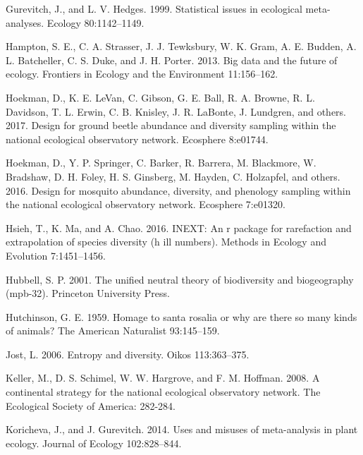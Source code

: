 \documentclass[
  12pt,
]{article}
\newlength{\cslhangindent}
\newenvironment{cslreferences}%
  {\setlength{\parindent}{0pt}%
  \everypar{\setlength{\hangindent}{\cslhangindent}}\ignorespaces}%
  {\par}
\begin{document}
\begin{cslreferences}
\leavevmode\hypertarget{ref-gurevitch1999statistical}{}%
Gurevitch, J., and L. V. Hedges. 1999. Statistical issues in ecological meta-analyses. Ecology 80:1142--1149.

\leavevmode\hypertarget{ref-hampton2013big}{}%
Hampton, S. E., C. A. Strasser, J. J. Tewksbury, W. K. Gram, A. E. Budden, A. L. Batcheller, C. S. Duke, and J. H. Porter. 2013. Big data and the future of ecology. Frontiers in Ecology and the Environment 11:156--162.

\leavevmode\hypertarget{ref-hoekman2017design}{}%
Hoekman, D., K. E. LeVan, C. Gibson, G. E. Ball, R. A. Browne, R. L. Davidson, T. L. Erwin, C. B. Knisley, J. R. LaBonte, J. Lundgren, and others. 2017. Design for ground beetle abundance and diversity sampling within the national ecological observatory network. Ecosphere 8:e01744.

\leavevmode\hypertarget{ref-hoekman2016design}{}%
Hoekman, D., Y. P. Springer, C. Barker, R. Barrera, M. Blackmore, W. Bradshaw, D. H. Foley, H. S. Ginsberg, M. Hayden, C. Holzapfel, and others. 2016. Design for mosquito abundance, diversity, and phenology sampling within the national ecological observatory network. Ecosphere 7:e01320.

\leavevmode\hypertarget{ref-hsieh2016inext}{}%
Hsieh, T., K. Ma, and A. Chao. 2016. INEXT: An r package for rarefaction and extrapolation of species diversity (h ill numbers). Methods in Ecology and Evolution 7:1451--1456.

\leavevmode\hypertarget{ref-hubbell2001unified}{}%
Hubbell, S. P. 2001. The unified neutral theory of biodiversity and biogeography (mpb-32). Princeton University Press.

\leavevmode\hypertarget{ref-hutchinson1959homage}{}%
Hutchinson, G. E. 1959. Homage to santa rosalia or why are there so many kinds of animals? The American Naturalist 93:145--159.

\leavevmode\hypertarget{ref-jost2006entropy}{}%
Jost, L. 2006. Entropy and diversity. Oikos 113:363--375.

\leavevmode\hypertarget{ref-keller2008continental}{}%
Keller, M., D. S. Schimel, W. W. Hargrove, and F. M. Hoffman. 2008. A continental strategy for the national ecological observatory network. The Ecological Society of America: 282-284.

\leavevmode\hypertarget{ref-koricheva2014uses}{}%
Koricheva, J., and J. Gurevitch. 2014. Uses and misuses of meta-analysis in plant ecology. Journal of Ecology 102:828--844.


\end{cslreferences}
\end{document}

